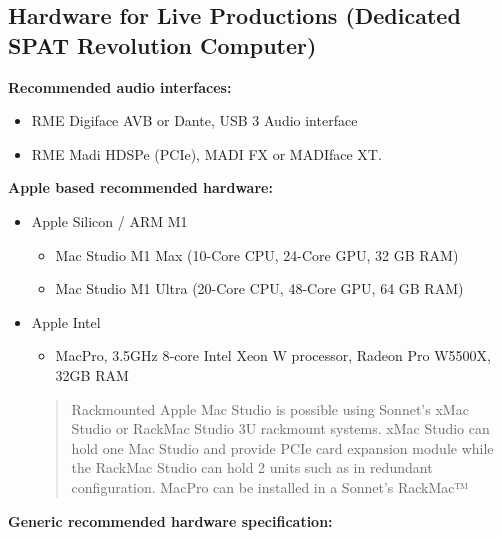 \documentclass[
  letterpaper,
  DIV=11,
  numbers=noendperiod]{scrreport}
\providecommand{\tightlist}{%
  \setlength{\itemsep}{0pt}\setlength{\parskip}{0pt}}\usepackage{longtable,booktabs,array}
\begin{document}
\hypertarget{hardware-for-live-productions-dedicated-spat-revolution-computer}{%
\subsection{Hardware for Live Productions (Dedicated SPAT Revolution
Computer)}\label{hardware-for-live-productions-dedicated-spat-revolution-computer}}

\textbf{Recommended audio interfaces:}

\begin{itemize}
\tightlist
\item
  RME Digiface AVB or Dante, USB 3 Audio interface
\item
  RME Madi HDSPe (PCIe), MADI FX or MADIface XT.
\end{itemize}

\textbf{Apple based recommended hardware:}

\begin{itemize}
\tightlist
\item
  Apple Silicon / ARM M1

  \begin{itemize}
  \tightlist
  \item
    Mac Studio M1 Max (10-Core CPU, 24-Core GPU, 32 GB RAM)
  \item
    Mac Studio M1 Ultra (20-Core CPU, 48-Core GPU, 64 GB RAM)
  \end{itemize}
\item
  Apple Intel

  \begin{itemize}
  \tightlist
  \item
    MacPro, 3.5GHz 8‑core Intel Xeon W processor, Radeon Pro W5500X,
    32GB RAM
  \end{itemize}

  \begin{quote}
  Rackmounted Apple Mac Studio is possible using Sonnet's xMac Studio or
  RackMac Studio 3U rackmount systems. xMac Studio can hold one Mac
  Studio and provide PCIe card expansion module while the RackMac Studio
  can hold 2 units such as in redundant configuration. MacPro can be
  installed in a Sonnet's RackMac™
  \end{quote}
\end{itemize}

\textbf{Generic recommended hardware specification:}
\end{document}
